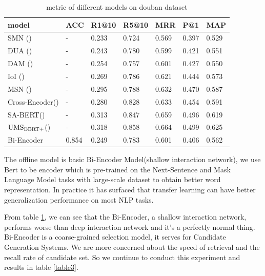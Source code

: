 \documentclass{article}
\begin{document}
\begin{table}[htb]
	\centering
	\caption{metric of different models on douban dataset}
\begin{tabular}{lllllll} 
model & ACC & R1@10 & R5@10 & MRR & P@1 & MAP \\
\hline 
 SMN (\cite{wu2016sequential}) & - & 0.233 & 0.724 & 0.569 & 0.397 & 0.529 \\
 DUA (\cite{zhang2018modeling}) & - & 0.243 & 0.780 & 0.599 & 0.421 & 0.551 \\
 DAM (\cite{zhou2018multi}) & - & 0.254 & 0.757 & 0.601 & 0.427 & 0.550 \\
 IoI (\cite{tao2019one}) & - & 0.269 & 0.786 & 0.621 & 0.444 & 0.573 \\
 MSN (\cite{yuan2019multi}) & - & 0.295 & 0.788 & 0.632 & 0.470 & 0.587 \\
 \hline
 Cross-Encoder(\cite{gu2020speaker}) & - & 0.280 & 0.828 & 0.633 & 0.454 & 0.591 \\
 SA-BERT(\cite{gu2020speaker}) & - & 0.313 & 0.847 & 0.659 & 0.496 & 0.619 \\
 $\rm {UMS_{BERT+}}$(\cite{whang2020response}) & - & 0.318 & 0.858 & 0.664 & 0.499 & 0.625 \\
 \hline
 Bi-Encoder & 0.854 & 0.249 & 0.783 & 0.601 & 0.406 & 0.562 \\

\end{tabular}
\label{table2}	
\end{table}

The offline model is basic Bi-Encoder Model(shallow interaction network), we use Bert to be encoder which is pre-trained on the Next-Sentence and Mask Language Model tasks with large-scale dataset to obtain better word representation. In practice it has surfaced that transfer learning can have better generalization performance on most NLP tasks. 

From table \ref{table2}, we can see that the Bi-Encoder, a shallow interaction network, performs worse than deep interaction network and it's a perfectly normal thing. Bi-Encoder is a coarse-grained selection model, it serves for Candidate Generation Systems. We are more concerned about the speed of retrieval and the recall rate of candidate set. So we continue to conduct this experiment and results in table \ref{table3}. 
\end{document}
